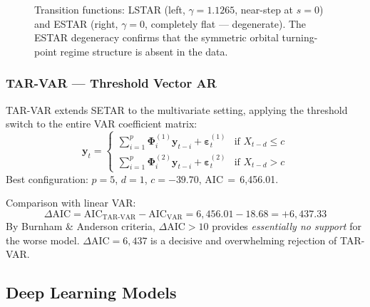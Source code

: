 \documentclass[conference]{IEEEtran}
\begin{document}
\begin{figure}[H]
  \centering
  \fbox{\rule{0pt}{4cm}\rule{\linewidth}{0pt}}
  \caption{Transition functions: LSTAR (left, $\gamma=1.1265$, near-step at
           $s=0$) and ESTAR (right, $\gamma=0$, completely flat --- degenerate).
           The ESTAR degeneracy confirms that the symmetric orbital turning-point
           regime structure is absent in the data.}
  \label{fig:lstar_estar}
\end{figure}

\subsubsection{TAR-VAR --- Threshold Vector AR}
TAR-VAR extends SETAR to the multivariate setting, applying the threshold
switch to the entire VAR coefficient matrix:
\begin{equation}
\mathbf{y}_t =
\begin{cases}
\sum_{i=1}^{p} \boldsymbol{\Phi}_i^{(1)} \mathbf{y}_{t-i} + \boldsymbol{\varepsilon}_t^{(1)}
  & \text{if } X_{t-d} \leq c \\[4pt]
\sum_{i=1}^{p} \boldsymbol{\Phi}_i^{(2)} \mathbf{y}_{t-i} + \boldsymbol{\varepsilon}_t^{(2)}
  & \text{if } X_{t-d} > c
\end{cases}
\label{eq:tarvar}
\end{equation}
Best configuration: $p=5$, $d=1$, $c=-39.70$, AIC\,$=$\,6{,}456.01.

Comparison with linear VAR:
\begin{equation}
\Delta\text{AIC} = \text{AIC}_\text{TAR-VAR} - \text{AIC}_\text{VAR}
= 6{,}456.01 - 18.68 = +6{,}437.33
\label{eq:delta_aic}
\end{equation}
By Burnham \& Anderson \cite{burnham2002} criteria, $\Delta\text{AIC} > 10$
provides \emph{essentially no support} for the worse model. $\Delta\text{AIC}
= 6{,}437$ is a decisive and overwhelming rejection of TAR-VAR.

\subsection{Deep Learning Models}
\end{document}
